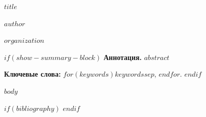 \documentclass[a4paper,14pt]{extarticle}
\begin{document}
\begin{center}
  {\bfseries $title$\par}
  \vspace{0.65\baselineskip}
  {$author$\par}
  \vspace{0.25\baselineskip}
  {\itshape $organization$\par}
\end{center}

$if(show-summary-block)$
\vspace{0.65\baselineskip}
\noindent\textbf{Аннотация.} $abstract$

\vspace{0.35\baselineskip}
\noindent\textbf{Ключевые слова:}
$for(keywords)$$keywords$$sep$, $endfor$.
$endif$

\vspace{0.65\baselineskip}

$body$

$if(bibliography)$
\printbibliography[heading=practicebibliography]
$endif$
\end{document}
